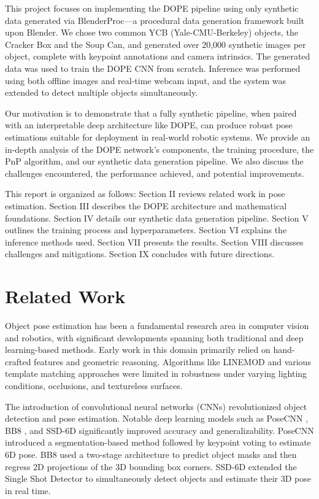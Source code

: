 \documentclass[conference]{IEEEtran}
\begin{document}
This project focuses on implementing the DOPE pipeline using only synthetic data generated via BlenderProc—a procedural data generation framework built upon Blender. We chose two common YCB (Yale-CMU-Berkeley) objects, the Cracker Box and the Soup Can, and generated over 20,000 synthetic images per object, complete with keypoint annotations and camera intrinsics. The generated data was used to train the DOPE CNN from scratch. Inference was performed using both offline images and real-time webcam input, and the system was extended to detect multiple objects simultaneously.

Our motivation is to demonstrate that a fully synthetic pipeline, when paired with an interpretable deep architecture like DOPE, can produce robust pose estimations suitable for deployment in real-world robotic systems. We provide an in-depth analysis of the DOPE network's components, the training procedure, the PnP algorithm, and our synthetic data generation pipeline. We also discuss the challenges encountered, the performance achieved, and potential improvements.

This report is organized as follows: Section II reviews related work in pose estimation. Section III describes the DOPE architecture and mathematical foundations. Section IV details our synthetic data generation pipeline. Section V outlines the training process and hyperparameters. Section VI explains the inference methods used. Section VII presents the results. Section VIII discusses challenges and mitigations. Section IX concludes with future directions.


\section{Related Work}

Object pose estimation has been a fundamental research area in computer vision and robotics, with significant developments spanning both traditional and deep learning-based methods. Early work in this domain primarily relied on hand-crafted features and geometric reasoning. Algorithms like LINEMOD and various template matching approaches were limited in robustness under varying lighting conditions, occlusions, and textureless surfaces.

The introduction of convolutional neural networks (CNNs) revolutionized object detection and pose estimation. Notable deep learning models such as PoseCNN \cite{xiang2018posecnn}, BB8 \cite{rad2017bb8}, and SSD-6D \cite{kehl2017ssd} significantly improved accuracy and generalizability. PoseCNN introduced a segmentation-based method followed by keypoint voting to estimate 6D pose. BB8 used a two-stage architecture to predict object masks and then regress 2D projections of the 3D bounding box corners. SSD-6D extended the Single Shot Detector to simultaneously detect objects and estimate their 3D pose in real time.
\end{document}
